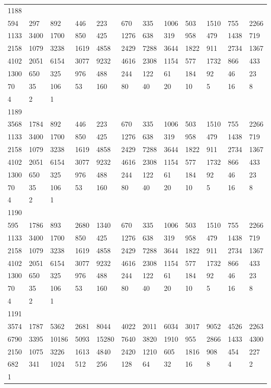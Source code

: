 \begin{longtable}{llllllllllll}
1188&&&&&&&&&&&\\
594& 297& 892& 446& 223& 670& 335& 1006& 503& 1510& 755& 2266\\
1133& 3400& 1700& 850& 425& 1276& 638& 319& 958& 479& 1438& 719\\
2158& 1079& 3238& 1619& 4858& 2429& 7288& 3644& 1822& 911& 2734& 1367\\
4102& 2051& 6154& 3077& 9232& 4616& 2308& 1154& 577& 1732& 866& 433\\
1300& 650& 325& 976& 488& 244& 122& 61& 184& 92& 46& 23\\
70& 35& 106& 53& 160& 80& 40& 20& 10& 5& 16& 8\\
4& 2& 1& \\

1189&&&&&&&&&&&\\
3568& 1784& 892& 446& 223& 670& 335& 1006& 503& 1510& 755& 2266\\
1133& 3400& 1700& 850& 425& 1276& 638& 319& 958& 479& 1438& 719\\
2158& 1079& 3238& 1619& 4858& 2429& 7288& 3644& 1822& 911& 2734& 1367\\
4102& 2051& 6154& 3077& 9232& 4616& 2308& 1154& 577& 1732& 866& 433\\
1300& 650& 325& 976& 488& 244& 122& 61& 184& 92& 46& 23\\
70& 35& 106& 53& 160& 80& 40& 20& 10& 5& 16& 8\\
4& 2& 1& \\

1190&&&&&&&&&&&\\
595& 1786& 893& 2680& 1340& 670& 335& 1006& 503& 1510& 755& 2266\\
1133& 3400& 1700& 850& 425& 1276& 638& 319& 958& 479& 1438& 719\\
2158& 1079& 3238& 1619& 4858& 2429& 7288& 3644& 1822& 911& 2734& 1367\\
4102& 2051& 6154& 3077& 9232& 4616& 2308& 1154& 577& 1732& 866& 433\\
1300& 650& 325& 976& 488& 244& 122& 61& 184& 92& 46& 23\\
70& 35& 106& 53& 160& 80& 40& 20& 10& 5& 16& 8\\
4& 2& 1& \\

1191&&&&&&&&&&&\\
3574& 1787& 5362& 2681& 8044& 4022& 2011& 6034& 3017& 9052& 4526& 2263\\
6790& 3395& 10186& 5093& 15280& 7640& 3820& 1910& 955& 2866& 1433& 4300\\
2150& 1075& 3226& 1613& 4840& 2420& 1210& 605& 1816& 908& 454& 227\\
682& 341& 1024& 512& 256& 128& 64& 32& 16& 8& 4& 2\\
1& \\


\end{longtable}
